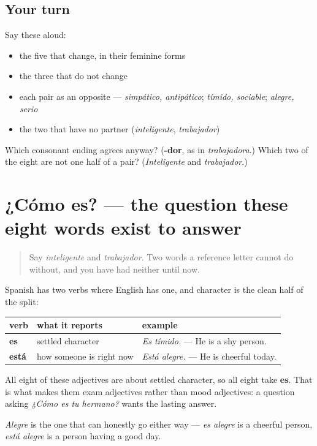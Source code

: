 \subsection*{Your turn}
Say these aloud:

\begin{itemize}
\raggedright
  \item the five that change, in their feminine forms
  \item the three that do not change
  \item each pair as an opposite — \emph{simpático, antipático}; \emph{tímido, sociable}; \emph{alegre, serio}
  \item the two that have no partner (\emph{inteligente}, \emph{trabajador})
\end{itemize}

\begin{tcolorbox}[breakable,colback=teal!4,colframe=teal!35!black,title={Before you move on}]
Which consonant ending agrees anyway? (\textbf{-dor}, as in \emph{trabajadora}.) Which two of the eight are not one half of a pair? (\emph{Inteligente} and \emph{trabajador}.)
\end{tcolorbox}
\section[¿Cómo es?]{¿Cómo es? — the question these eight words exist to answer}

\label{lesson:ES-C423-sintesis-persona}



\begin{quote}
Say \emph{inteligente} and \emph{trabajador}. Two words a reference letter cannot do without, and you have had neither until now.
\end{quote}

\begin{grammarlens}[title={Grammar Lens: es for character, está for the moment}]
Spanish has two verbs where English has one, and character is the clean half of the split:

\noindent
\begin{tabularx}{\linewidth}{@{}>{\raggedright\arraybackslash}X>{\raggedright\arraybackslash}X>{\raggedright\arraybackslash}X@{}}
\toprule
\textbf{verb} & \textbf{what it reports} & \textbf{example} \\
\midrule
\textbf{es} & settled character & \emph{Es tímido.} — He is a shy person. \\
\textbf{está} & how someone is right now & \emph{Está alegre.} — He is cheerful today. \\
\bottomrule
\end{tabularx}

All eight of these adjectives are about settled character, so all eight take \textbf{es}. That is what makes them exam adjectives rather than mood adjectives: a question asking \emph{¿Cómo es tu hermano?} wants the lasting answer.

\emph{Alegre} is the one that can honestly go either way — \emph{es alegre} is a cheerful person, \emph{está alegre} is a person having a good day.
\end{grammarlens}

